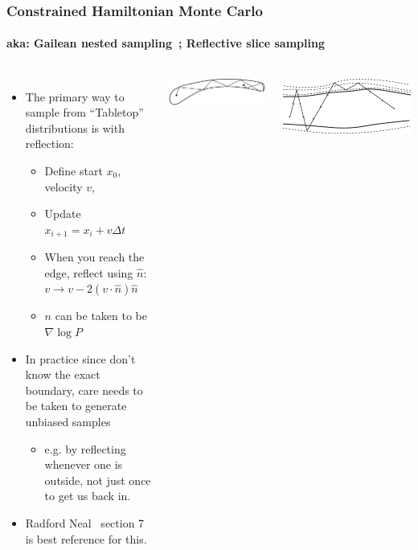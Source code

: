 \documentclass[aspectratio=169]{beamer}
\begin{document}
\begin{frame}
    \frametitle{Constrained Hamiltonian Monte Carlo~}
    \framesubtitle{aka: Gailean nested sampling~; Reflective slice sampling~}

    \begin{columns}
        \begin{itemize}
            \item The primary way to sample from ``Tabletop'' distributions is with reflection:
                \begin{itemize}
                    \item Define start $x_0$, velocity $v$,
                    \item Update $x_{i+1} = x_i + v \Delta t$
                    \item When you reach the edge, reflect using $\hat{n}$:
                        $ v \to v - 2 (v\cdot \hat{n}) \hat{n}$
                    \item $n$ can be taken to be $\nabla \log P$
                \end{itemize}
            \item In practice since don't know the exact boundary, care needs to be taken to generate unbiased samples 
                \begin{itemize}
                    \item e.g. by reflecting whenever one is outside, not just once to get us back in.
                \end{itemize}
            \item Radford Neal~ section 7 is best reference for this.
        \end{itemize}
        
        \includegraphics[width=\textwidth]{figures/reflect}
        \vspace{1em}

        \includegraphics[width=\textwidth]{figures/bounce}
    \end{columns}

\end{frame}
\end{document}
